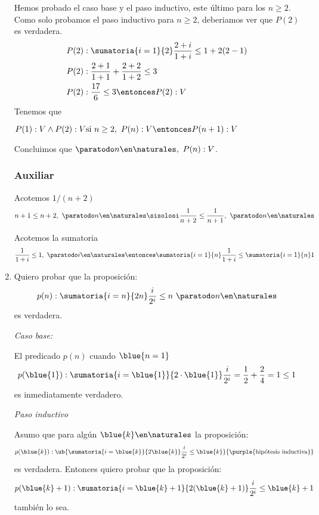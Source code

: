 \begin{enumerate}[label=\roman*)]
        Hemos probado el caso base y el paso inductivo, este último para los $n \geq 2$. Como solo probamos el paso
        inductivo para $n \geq 2$, deberiamos ver que $P(2)$ es verdadera.
        \begin{align*}
          P(2) & : \sumatoria{i=1}{2} \frac{2+i}{1+i} \leq 1 + 2(2-1) \\
          P(2) & : \frac{2+1}{1+1} + \frac{2+2}{1+2} \leq 3           \\
          P(2) & : \frac{17}{6} \leq 3 \entonces P(2): V
        \end{align*}
        Tenemos que

        $P(1): V \land P(2): V \\
          \text{si } n \geq 2, \ P(n): V \entonces P(n+1): V$

        Concluimos que $\paratodo n \en \naturales, \ P(n): V$.

        \subsubsection*{Auxiliar}
        Acotemos $1/(n+2)$
        \begin{align*}
          n+1 \leq n + 2 , \ \paratodo n \en \naturales \sisolosi \frac{1}{n+2} \leq \frac{1}{n+1},
          \ \paratodo n \en \naturales
        \end{align*}

        Acotemos la sumatoria
        \begin{align*}
          \frac{1}{1+i} \leq 1, \ \paratodo i \en \naturales \entonces \sumatoria{i=1}{n} \frac{1}{1+i} \leq \sumatoria{i=1}{n} 1
        \end{align*}

  \item
        Quiero probar que la proposición:
        $$
          p(n): \sumatoria{i = n}{2n} \frac{i}{2^i} \leq n ~ \paratodo n \en \naturales
        $$
        es verdadera.

        \textit{Caso base:}

        El predicado $p(n)$ cuando $\blue{n = 1}$
        $$
          p(\blue{1}) : \sumatoria{i = \blue{1}}{2 \cdot \blue{1}} \frac{i}{2^i} = \frac{1}{2} + \frac{2}{4} = 1 \leq 1
        $$
        es inmediatamente verdadero.

        \medskip

        \textit{Paso inductivo}

        Asumo que para algún $\blue{k} \en \naturales$ la proposición:
        $$
          p(\blue{k}):
          \ub{
            \sumatoria{i = \blue{k}}{2\blue{k}} \frac{i}{2^i} \leq \blue{k}
          }{
            \text{\purple{hipótesis inductiva}}
          }
        $$
        es verdadera. Entonces quiero probar que la proposición:
        $$
          p(\blue{k} + 1): \sumatoria{i = \blue{k} + 1}{2(\blue{k} + 1)} \frac{i}{2^i} \leq \blue{k} + 1
        $$
        también lo sea.


\end{enumerate}
